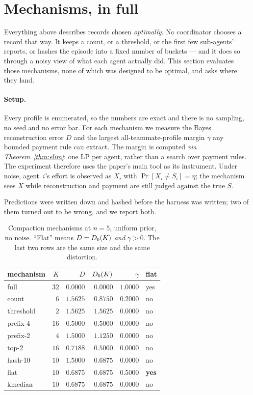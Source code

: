 \section{Mechanisms, in full}
\label{app:mechdetail}

Everything above describes records chosen \emph{optimally}. No coordinator
chooses a record that way. It keeps a count, or a threshold, or the first few
sub-agents' reports, or hashes the episode into a fixed number of buckets --- and
it does so through a noisy view of what each agent actually did. This section
evaluates those mechanisms, none of which was designed to be optimal, and asks
where they land.

\paragraph{Setup.}
Every profile is enumerated, so the numbers are exact and there is no sampling,
no seed and no error bar. For each mechanism we measure the Bayes reconstruction
error $D$ and the largest all-teammate-profile margin $\gamma$ any bounded
payment rule can extract. The margin is computed \emph{via
Theorem~\ref{thm:elim}}: one LP per agent, rather than a search over payment
rules. The experiment therefore uses the paper's main tool as its instrument.
Under noise, agent~$i$'s effort is observed as $X_i$ with
$\Pr[X_i \ne S_i] = \eta$; the mechanism sees $X$ while reconstruction and
payment are still judged against the true $S$.

Predictions were written down and hashed before the harness was written; two of
them turned out to be wrong, and we report both.

\begin{table}[t]
\centering
\caption{Compaction mechanisms at $n = 5$, uniform prior, no noise. ``Flat''
means $D = D_0(K)$ \emph{and} $\gamma > 0$. The last two rows are the same
size and the same distortion.}
\label{tab:mechanisms}
\small
\begin{tabular}{@{}lrrrrl@{}}
\toprule
mechanism & $K$ & $D$ & $D_0(K)$ & $\gamma$ & flat \\
\midrule
full        & $32$ & $0.0000$ & $0.0000$ & $1.0000$ & yes \\
count       & $6$  & $1.5625$ & $0.8750$ & $0.2000$ & no \\
threshold   & $2$  & $1.5625$ & $1.5625$ & $0.0000$ & no \\
prefix-4    & $16$ & $0.5000$ & $0.5000$ & $0.0000$ & no \\
prefix-2    & $4$  & $1.5000$ & $1.1250$ & $0.0000$ & no \\
top-2       & $16$ & $0.7188$ & $0.5000$ & $0.0000$ & no \\
hash-10     & $10$ & $1.5000$ & $0.6875$ & $0.0000$ & no \\
\midrule
flat        & $10$ & $0.6875$ & $0.6875$ & $0.5000$ & \textbf{yes} \\
kmedian     & $10$ & $0.6875$ & $0.6875$ & $0.0000$ & no \\
\bottomrule
\end{tabular}
\end{table}

